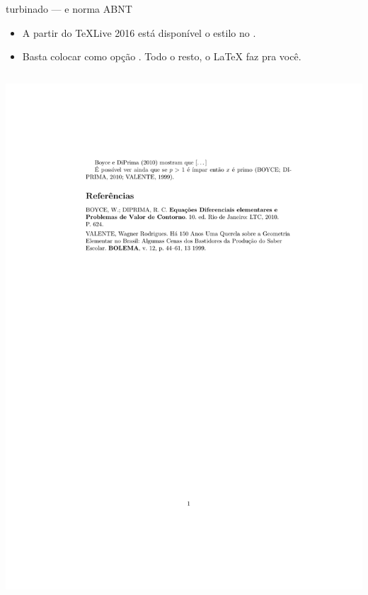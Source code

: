\documentclass{beamer}
\begin{document}
\begin{frame}[fragile]{\insertsubsection{} turbinado ---  e norma ABNT}
\begin{itemize}
  \item  A partir do TeXLive 2016 está disponível o estilo  no .
  \item Basta colocar  como opção .
  Todo o resto, o \LaTeX{} faz pra você.
\end{itemize}
\begin{minipage}{0.525\linewidth}
  \inputminted[fontsize=\tiny,frame=single,resetmargins]{latex}{bib-example-abnt.tex}
\end{minipage}
\begin{minipage}{0.4\linewidth}
  \includegraphics[width=\textwidth,clip,trim=1.8in 5in 1.5in 1in]{bib-example-abnt.pdf}
\end{minipage}
\end{frame}
\end{document}
